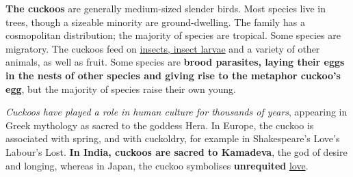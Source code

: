 \vspace{0.8cm}

\setlength{\parindent}{10ex}
 {\textbf{The cuckoos} are generally medium-sized slender birds. Most species live in trees, though a sizeable minority are ground-dwelling. The family has a cosmopolitan distribution; the majority of species are tropical. Some species are migratory. The cuckoos feed on \underline{insects, insect larvae} and a variety of other animals, as well as fruit. Some species are \textbf{brood parasites, laying their eggs in the nests of other species and giving rise to the metaphor cuckoo's egg}, but the majority of species raise their own young.} \par
 
\setlength{\parindent}{10ex}
 {\emph{Cuckoos have played a role in human culture for thousands of years}, appearing in Greek mythology as sacred to the goddess Hera. In Europe, the cuckoo is associated with spring, and with cuckoldry, for example in Shakespeare's Love's Labour's Lost.\textbf{ In India, cuckoos are sacred to Kamadeva}, the god of desire and longing, whereas in Japan, the cuckoo symbolises \textbf{unrequited} \underline{love}.} \par
 
 




